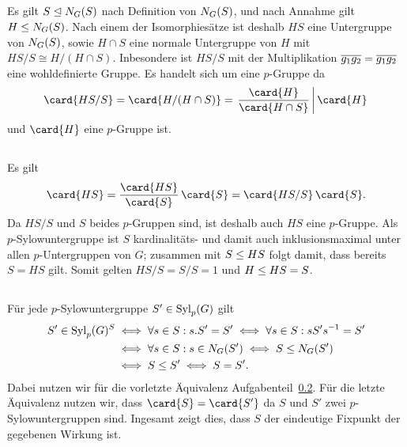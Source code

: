 \subsection{}

Es gilt $S \nsubgroup \normalizer{S}{G}$ nach Definition von $\normalizer{S}{G}$, und nach Annahme gilt $H \subgroup \normalizer{S}{G}$.
Nach einem der Isomorphiesätze ist deshalb $HS$ eine Untergruppe von $\normalizer{S}{G}$, sowie $H \cap S$ eine normale Untergruppe von $H$ mit $HS/S \cong H/(H \cap S)$.
Inbesondere ist $HS/S$ mit der Multiplikation $\class{g_1} \class{g_2} = \class{g_1 g_2}$ eine wohldefinierte Gruppe.
Es handelt sich um eine $p$-Gruppe da
\[
                \card{ HS/S }
  =             \card{ H/(H \cap S) }
  = \left.      \frac{ \card{H} }{ \card{H \cap S} }
  \,\middle|\,  \card{H}
    \right.
\]
und $\card{H}$ eine $p$-Gruppe ist.





\subsection{}
\label{subsection: contained in Sylow subgroup}

Es gilt
\[
    \card{HS}
  = \frac{\card{HS}}{\card{S}} \, \card{S}
  = \card{HS/S} \, \card{S}.
\]
Da $HS/S$ und $S$ beides $p$-Gruppen sind, ist deshalb auch $HS$ eine $p$-Gruppe.
Als $p$-Sylowuntergruppe ist $S$ kardinalitäts- und damit auch inklusionsmaximal unter allen $p$-Untergruppen von $G$;
zusammen mit $S \subgroup HS$ folgt damit, dass bereits $S = HS$ gilt.
Somit gelten $HS/S = S/S = 1$ und $H \subgroup HS = S$.





\subsection{}
\label{subsection: unique fixed point}

Für jede $p$-Sylowuntergruppe $S' \in \Sylow{p}{G}$ gilt
\begin{align*}
        S' \in \Sylow{p}{G}^S
  &\iff \forall s \in S: s.S' = S'
   \iff \forall s \in S: s S' s^{-1} = S'
  \\
  &\iff \forall s \in S: s \in \normalizer{S'}{G}
   \iff S \subgroup \normalizer{S'}{G}
  \\
  &\iff S \subgroup S'
   \iff S = S'.
\end{align*}
Dabei nutzen wir für die vorletzte Äquivalenz Aufgabenteil~\ref{subsection: contained in Sylow subgroup}.
Für die letzte Äquivalenz nutzen wir, dass $\card{S} = \card{S'}$ da $S$ und $S'$ zwei $p$-Sylowuntergruppen sind.
Ingesamt zeigt dies, dass $S$ der eindeutige Fixpunkt der gegebenen Wirkung ist.





